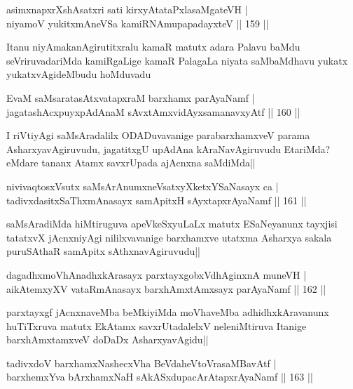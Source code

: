 \begin{shl}
asimxnapxrXshAsatxri sati kirxyAtataPxlasaMgateVH |\\
niyamoV yukitxmAneVSa kamiRNAmupapadayxteV \hfill || 159 ||
\end{shl}

\begin{artha}
Itanu niyAmakanAgirutitxralu kamaR matutx adara Palavu baMdu seVriruvadariMda kamiRgaLige kamaR PalagaLa niyata saMbaMdhavu yukatx yukatxvAgideMbudu hoMduvadu
\end{artha}

\begin{shl}
EvaM saMsaratasAtxvatapxraM barxhamx parAyaNamf |\\
jagatashAcxpuyxpAdAnaM sAvxtAmxvidAyxsamanavxyAtf \hfill || 160 ||
\end{shl}

\begin{artha}%
I riVtiyAgi saMsAradalilx ODADuvavanige parabarxhamxveV parama AsharxyavAgiruvudu, jagatitxgU upAdAna kAraNavAgiruvudu EtariMda? eMdare tananx Atamx savxrUpada ajAcnxna saMdiMda||
\end{artha}

\begin{shl}
nivivaqtosxVsutx saMsArAnumxneVsatxyXketxYSaNasayx ca |\\
tadivxdasitxSaThxmAnasayx samApitxH sAyxtapxrAyaNamf \hfill || 161 ||
\end{shl}

\begin{artha}
saMsAradiMda hiMtiruguva apeVkeSxyuLaLx matutx ESaNeyanunx tayxjisi tatatxvX jAcnxniyAgi nililxvavanige barxhamxve utatxma Asharxya sakala puruSAthaR samApitx sAthxnavAgiruvudu||
\end{artha}

\begin{shl}
dagadhxmoVhAnadhxkArasayx parxtayxgobxVdhAginxnA muneVH |\\
aikAtemxyXV vataRmAnasayx barxhAmxtAmx\s sayx parAyaNamf \hfill || 162 ||
\end{shl}

\begin{artha}
parxtayxgf jAcnxnaveMba beMkiyiMda moVhaveMba adhidhxkAravanunx huTiTxruva matutx EkAtamx savxrUtadalelxV neleniMtiruva Itanige barxhAmxtamxveV doDaDx AsharxyavAgidu||
\end{artha}

\begin{shl}
tadivxdoV barxhamxNashecxVha BeVdaheVtoVrasaMBavAtf |\\
barxhemxYva bArxhamxNaH sAkASxdupacArAtapxrAyaNamf \hfill || 163 ||
\end{shl}

